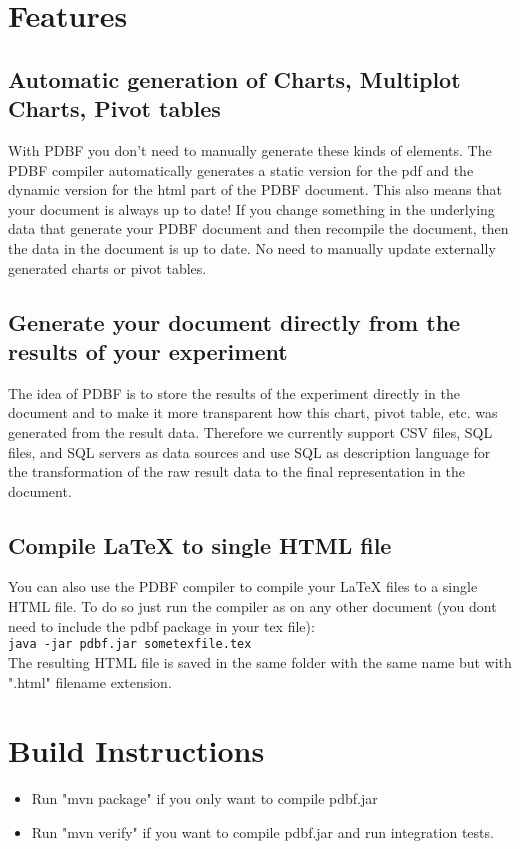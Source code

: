 \documentclass[11pt]{article}
\begin{document}
\section{Features}
\subsection{Automatic generation of Charts, Multiplot Charts, Pivot tables}
With PDBF you don't need to manually generate these kinds of elements. The PDBF compiler automatically generates a static version for the pdf and the dynamic version for the html part of the PDBF document. This also means that your document is always up to date! If you change something in the underlying data that generate your PDBF document and then recompile the document, then the data in the document is up to date. No need to manually update externally generated charts or pivot tables.

\subsection{Generate your document directly from the results of your experiment}
The idea of PDBF is to store the results of the experiment directly in the document and to make it more transparent how this chart, pivot table, etc. was generated from the result data. Therefore we currently support CSV files, SQL files, and SQL servers as data sources and use SQL as description language for the transformation of the raw result data to the final representation in the document.

\subsection{Compile LaTeX to single HTML file}
You can also use the PDBF compiler to compile your LaTeX files to a single HTML file.
To do so just run the compiler as on any other document (you dont need to include the pdbf package in your tex file):\\[3pt]
\texttt{java -jar pdbf.jar sometexfile.tex}\\[3pt]
The resulting HTML file is saved in the same folder with the same name but with ".html" filename extension.

\section{Build Instructions}
\begin{itemize}
\item Run "mvn package" if you only want to compile pdbf.jar
\item Run "mvn verify" if you want to compile pdbf.jar and run integration tests.
\end{itemize}
\end{document}
